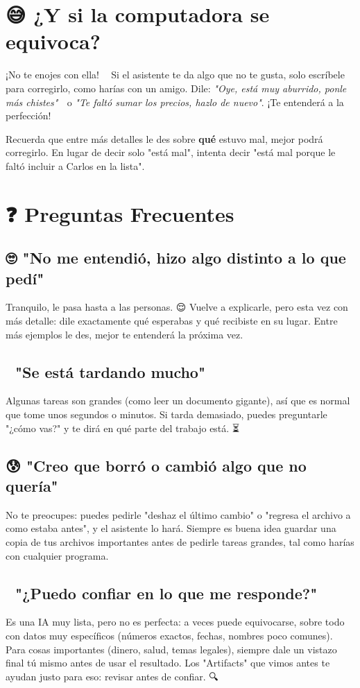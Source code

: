 \documentclass[12pt]{article}
\begin{document}
\newpage
\section{😅 ¿Y si la computadora se equivoca?}
¡No te enojes con ella! 🧘‍♀️ Si el asistente te da algo que no te gusta, solo escríbele para corregirlo, como harías con un amigo. Dile: \textit{"Oye, está muy aburrido, ponle más chistes"} 🤡 o \textit{"Te faltó sumar los precios, hazlo de nuevo"}. ¡Te entenderá a la perfección!

Recuerda que entre más detalles le des sobre \textbf{qué} estuvo mal, mejor podrá corregirlo. En lugar de decir solo "está mal", intenta decir "está mal porque le faltó incluir a Carlos en la lista". 🎯

\section{❓ Preguntas Frecuentes}

\subsection{🙄 "No me entendió, hizo algo distinto a lo que pedí"}
Tranquilo, le pasa hasta a las personas. 😌 Vuelve a explicarle, pero esta vez con más detalle: dile exactamente qué esperabas y qué recibiste en su lugar. Entre más ejemplos le des, mejor te entenderá la próxima vez.

\subsection{🐢 "Se está tardando mucho"}
Algunas tareas son grandes (como leer un documento gigante), así que es normal que tome unos segundos o minutos. Si tarda demasiado, puedes preguntarle "¿cómo vas?" y te dirá en qué parte del trabajo está. ⏳

\subsection{😰 "Creo que borró o cambió algo que no quería"}
No te preocupes: puedes pedirle "deshaz el último cambio" o "regresa el archivo a como estaba antes", y el asistente lo hará. Siempre es buena idea guardar una copia de tus archivos importantes antes de pedirle tareas grandes, tal como harías con cualquier programa. 💾

\subsection{🤨 "¿Puedo confiar en lo que me responde?"}
Es una IA muy lista, pero no es perfecta: a veces puede equivocarse, sobre todo con datos muy específicos (números exactos, fechas, nombres poco comunes). Para cosas importantes (dinero, salud, temas legales), siempre dale un vistazo final tú mismo antes de usar el resultado. Los "Artifacts" que vimos antes te ayudan justo para eso: revisar antes de confiar. 🔍
\end{document}
